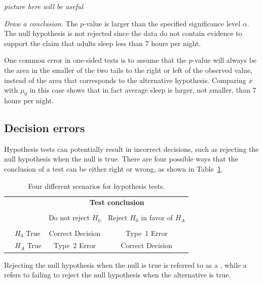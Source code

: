 \begin{spacing}{1.5}
\begin{example}
\textit{picture here will be useful}

\textit{Draw a conclusion}.  The $p$-value is larger than the specified significance level $\alpha$.  The null hypothesis is not rejected since the data do not contain evidence to support the claim that adults sleep less than 7 hours per night.

\end{example}

One common error in one-sided tests is to assume that the $p$-value will always be the area in the smaller of the two tails to the right or left of the observed value, instead of the area that corresponds to the alternative hypothesis.  Comparing $\overline{x}$ with $\mu_0$ in this case shows that in fact average sleep is larger, not smaller, than 7 hours per night.

\subsection{Decision errors}

Hypothesis tests can potentially result in incorrect decisions, such as rejecting the null hypothesis when the null is true. There are four possible ways that the conclusion of a test can be either right or wrong, as shown in Table~\ref{fourHTScenarios}. 

\begin{table}[ht]
	\centering
	\begin{tabular}{l l c c}
		& & \multicolumn{2}{c}{\textbf{Test conclusion}} \\
		\cline{3-4}
		\vspace{-3.7mm} \\
		& & Do not reject $H_0$ &  Reject $H_0$ in favor of $H_A$ \\
		\cline{2-4}
		\vspace{-3.7mm} \\
		& $H_0$ True & Correct Decision &  Type~1 Error \\
		\raisebox{1.5ex}{\textbf{Truth}} & $H_A$ True & Type~2 Error & Correct Decision\\
		\cline{2-4}
	\end{tabular}
	\caption{Four different scenarios for hypothesis tests.}
	\label{fourHTScenarios}
\end{table}

Rejecting the null hypothesis when the null is true is referred to as a , while a  refers to failing to reject the null hypothesis when the alternative is true. 


\end{spacing}

